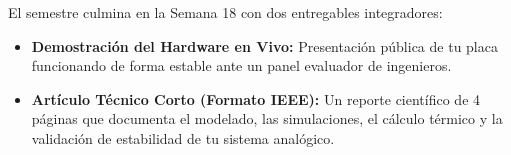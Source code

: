 \documentclass[11pt, a4paper]{article}
\begin{document}
El semestre culmina en la Semana 18 con dos entregables integradores:

\begin{itemize}
    \item \textbf{Demostración del Hardware en Vivo:} Presentación pública de tu placa funcionando de forma estable ante un panel evaluador de ingenieros.
    \item \textbf{Artículo Técnico Corto (Formato IEEE):} Un reporte científico de 4 páginas que documenta el modelado, las simulaciones, el cálculo térmico y la validación de estabilidad de tu sistema analógico.
\end{itemize}
\end{document}
